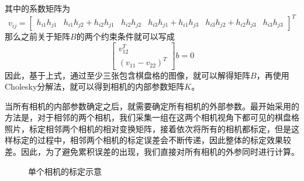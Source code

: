 其中的系数矩阵为
\begin{equation}
    v_{ij}=\left[ \begin{array}{cccccc} h_{i1}h_{j1} & h_{i1}h_{j2}+h_{i2}h_{j1} & h_{i2}h_{j2} & h_{i3}h_{j1}+h_{i1}h_{j3} & h_{i3}h_{j2}+h_{i2}h_{j3} & h_{i3}h_{j3} \end{array} \right]^T
\end{equation}
那么之前关于矩阵\(B\)的两个约束条件就可以写成
\begin{equation}
    \left[ \begin{array}{c} v^T_{12} \\ (v_{11}-v_{22})^T \end{array} \right]b=0
\end{equation}
因此，基于上式，通过至少三张包含棋盘格的图像，就可以解得矩阵\(B\)，再使用Cholesky分解法，就可以得到相机的内部参数矩阵\(K\)。


当所有相机的内部参数确定之后，就需要确定所有相机的外部参数。最开始采用的方法是，对于相邻的两个相机，我们采集一组在这两个相机视角下都可见的棋盘格照片，标定相邻两个相机的相对变换矩阵，接着依次将所有的相机都标定，但是这样标定的过程中，相邻两个相机的标定误差会不断传递，因此整体的标定效果较差。因此，为了避免累积误差的出现，我们直接对所有相机的外参同时进行计算。

\begin{figure}[htbp]
    \centering
    \caption{单个相机的标定示意\label{fig:calsingle}}
\end{figure}


